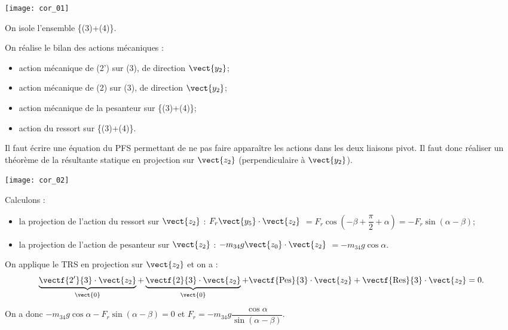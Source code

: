 \begin{corrige}
\begin{center}
\texttt{[image: cor\_01]}
\end{center}

On isole l'ensemble \{(3)+(4)\}. 

On réalise le bilan des actions mécaniques : 
\begin{itemize}
\item action mécanique de (2') sur (3), de direction $\vect{y_2}$;
\item action mécanique de (2) sur (3), de direction $\vect{y_2}$;
\item action mécanique de la pesanteur sur \{(3)+(4)\};
\item action du ressort sur \{(3)+(4)\}.
\end{itemize}

Il faut écrire une équation du PFS permettant de ne pas faire apparaître les actions dans les deux liaisons pivot. Il faut donc réaliser un théorème de la résultante statique en projection sur $\vect{z_2}$ (perpendiculaire à $\vect{y_2}$).

\end{corrige}
\else
\fi

\ifprof
\begin{marginfigure}
\texttt{[image: cor\_02]}
\end{marginfigure}

\begin{corrige}
Calculons : 
\begin{itemize}
\item la projection de l'action du ressort sur $\vect{z_2}$ : $F_r \vect{y_5} \cdot\vect{z_2}$ $=F_r\cos\left(-\beta +\dfrac{\pi}{2}+\alpha\right)=-F_r\sin\left(\alpha-\beta \right)$;
\item la projection de l'action de pesanteur sur $\vect{z_2}$ : $-m_{34} g \vect{z_0} \cdot\vect{z_2}$ $=-m_{34} g\cos\alpha$.
\end{itemize}
On applique le TRS en projection sur $\vect{z_2}$ et on a  :
$$
\underbrace{\vectf{2'}{3}\cdot \vect{z_2}}_{\vect{0}}+\underbrace{\vectf{2}{3}\cdot \vect{z_2}}_{\vect{0}}+\vectf{\text{Pes}}{3}\cdot \vect{z_2}+\vectf{\text{Res}}{3}\cdot \vect{z_2}=0.
$$

On a donc $-m_{34} g\cos\alpha -F_r\sin\left(\alpha-\beta \right) = 0$ et  
$\boxed{F_r = -m_{34} g \dfrac{\cos\alpha}{\sin\left(\alpha-\beta \right)}}$.



\end{corrige}
\else
\fi



